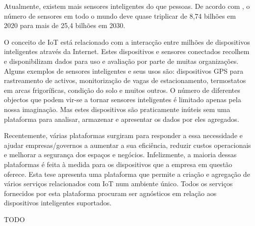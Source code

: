 \begin{abstractotherlanguage}

Atualmente, existem mais sensores inteligentes do que pessoas. De acordo com \cite{statista-number-devices}, o número de sensores em todo o mundo deve quase triplicar de 8,74 bilhões em 2020 para mais de 25,4 bilhões em 2030.

O conceito de \gls{IoT} está relacionado com a interacção entre milhões de dispositivos inteligentes através da Internet. Estes dispositivos e sensores conectados recolhem e disponibilizam dados para uso e avaliação por parte de muitas organizações.
Alguns exemplos de sensores inteligentes e seus usos são: dispositivos GPS para rastreamento de activos, monitorização de vagas de estacionamento, termostatos em arcas frigoríficas, condição do solo e muitos outros. O número de diferentes objectos que podem vir-se a tornar sensores inteligentes é limitado apenas pela nossa imaginação. Mas estes dispositivos são praticamente inúteis sem uma plataforma para analisar, armazenar e apresentar os dados por eles agregados.

Recentemente, várias plataformas surgiram para responder a essa necessidade e ajudar empresas/governos a aumentar a sua eficiência, reduzir custos operacionais e melhorar a segurança dos espaços e negócios. Infelizmente, a maioria dessas plataformas é feita à medida para os dispositivos que a empresa em questão oferece. Esta tese apresenta uma plataforma que permite a criação e agregação de vários serviços relacionados com \gls{IoT} num ambiente único. Todos os serviços fornecidos por esta plataforma procuram ser agnósticos em relação aos dispositivos inteligentes suportados.

\end{abstractotherlanguage}


\begin{acknowledgements}

TODO

\end{acknowledgements}


